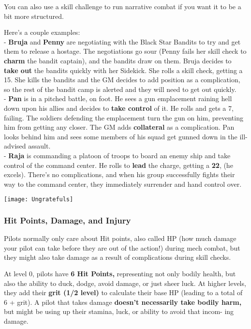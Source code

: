 You can also use a skill challenge to run narrative combat if you want it to be a bit more structured. 

Here’s a couple examples:\\
- \textbf{Bruja} and \textbf{Penny} are negotiating with the Black Star Bandits to try and get them to release a hostage. The negotiations go sour (Penny fails her skill check to \textbf{charm} the bandit captain), and the bandits draw on them. Bruja decides to \textbf{take out} the bandits quickly with her Sidekick. She rolls a skill check, getting a 15. She kills the bandits and the GM decides to add position as a complication, so the rest of the bandit camp is alerted and they will need to get out quickly.\\
- \textbf{Pan} is in a pitched battle, on foot. He sees a gun emplacement raining hell down upon his allies and decides to \textbf{take control} of it. He rolls and gets a 7, failing. The soldiers defending the emplacement turn the gun on him, preventing him from getting any closer. The GM adds \textbf{collateral} as a complication. Pan looks behind him and sees some members of his squad get gunned down in the ill-advised assault.\\
- \textbf{Raja} is commanding a platoon of troops to board an enemy ship and take control of the command center. He rolls to \textbf{lead} the charge, getting a \textbf{22}, (he excels). There’s no complications, and when his group successfully fights their way to the command center, they immediately surrender and hand control over.

\newpage
\begin{center}
  \texttt{[image: Ungratefuls]}
\end{center}
\subsubsection{Hit Points, Damage, and Injury}

Pilots normally only care about Hit points, also called HP (how much damage your pilot can take before they are out of the action!) during mech combat, but they might also take damage as a result of complications during skill checks.

At level 0, pilots have \textbf{6 Hit Points,} representing not only bodily health, but also the ability to duck, dodge, avoid damage, or just sheer luck. At higher levels, they add their \textbf{grit (1/2 level)} to calculate their base HP (leading to a total of 6 + grit). A pilot that takes damage \textbf{doesn’t necessarily take bodily harm,} but might be using up their stamina, luck, or ability to avoid that incom- ing damage.

